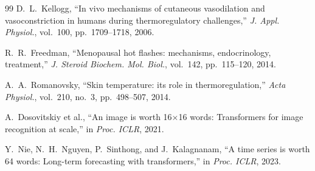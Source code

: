 \documentclass[10pt,twocolumn]{article}
\begin{document}
\begin{thebibliography}{99}
D.~L.~Kellogg, ``In vivo mechanisms of cutaneous vasodilation
and vasoconstriction in humans during thermoregulatory challenges,''
\textit{J. Appl. Physiol.}, vol.~100, pp.~1709--1718, 2006.

R.~R.~Freedman,
``Menopausal hot flashes: mechanisms, endocrinology, treatment,''
\textit{J. Steroid Biochem. Mol. Biol.}, vol.~142, pp.~115--120, 2014.

A.~A.~Romanovsky,
``Skin temperature: its role in thermoregulation,''
\textit{Acta Physiol.}, vol.~210, no.~3, pp.~498--507, 2014.

A.~Dosovitskiy et al.,
``An image is worth 16$\times$16 words: Transformers for image recognition
at scale,'' in \textit{Proc. ICLR}, 2021.

Y.~Nie, N.~H.~Nguyen, P.~Sinthong, and J.~Kalagnanam,
``A time series is worth 64 words: Long-term forecasting with transformers,''
in \textit{Proc. ICLR}, 2023.

\end{thebibliography}
\end{document}
